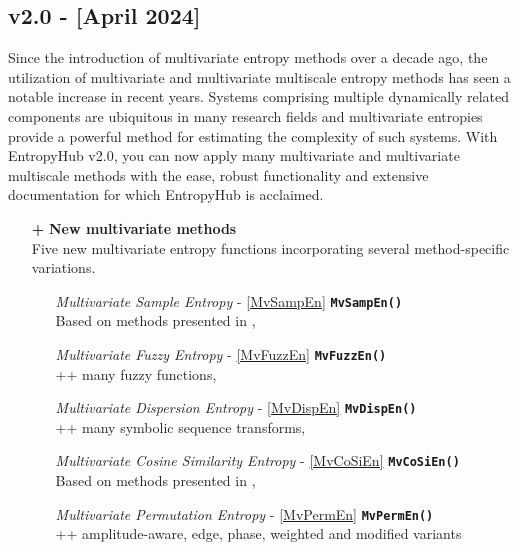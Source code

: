 \documentclass[12pt, a4paper, titlepage, openany]{book}
\begin{document}
\subsection{\textbf{v2.0} - [April 2024]}
Since the introduction of multivariate entropy methods over a decade ago, the utilization of multivariate and multivariate multiscale entropy methods has seen a notable increase in recent years. Systems comprising multiple dynamically related components are ubiquitous in many research fields and multivariate entropies provide a powerful method for estimating the complexity of such systems.
\newline With EntropyHub v2.0, you can now apply many multivariate and multivariate multiscale methods with the ease, robust functionality and extensive documentation for which EntropyHub is acclaimed.
\begin{itemize}
\item[\textbf{+}] \textbf{New multivariate methods}\\
Five new multivariate entropy functions incorporating several method-specific variations.
\begin{itemize}
\item[] \textit{Multivariate Sample Entropy} - \ref{MvSampEn} \hspace{15mm} \texttt{\textbf{MvSampEn()}} \\
Based on methods presented in \cite{MvSamp1}, \cite{MvSamp2}
\item[] \textit{Multivariate Fuzzy Entropy}  - \ref{MvFuzzEn} \hspace{19mm} \texttt{\textbf{MvFuzzEn()}}  \\
++ many fuzzy functions, \cite{MvFuzz1}
\item[] \textit{Multivariate Dispersion Entropy}  - \ref{MvDispEn} \hspace{12mm} \texttt{\textbf{MvDispEn()}}  \\ 
++ many symbolic sequence transforms, \cite{MvDisp1}
\item[] \textit{Multivariate Cosine Similarity Entropy}  - \ref{MvCoSiEn} \hspace{8mm}\texttt{\textbf{MvCoSiEn()}} \\
Based on methods presented in \cite{MvCoSi1},
\item[] \textit{Multivariate Permutation Entropy}  - \ref{MvPermEn} \hspace{14mm}\texttt{\textbf{MvPermEn()}} \\ 
++ amplitude-aware, edge, phase, weighted and modified variants
\end{itemize}


\end{itemize}
\end{document}
